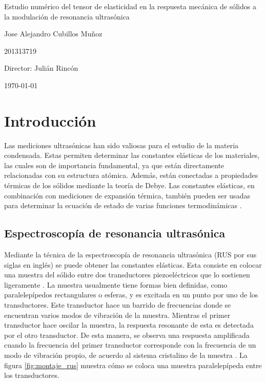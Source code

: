 \documentclass[12pt]{article}
\begin{document}
\begin{center}
\Huge
Estudio numérico del tensor de elasticidad en la respuesta mecánica de sólidos a la modulación de resonancia ultrasónica

\vspace{3mm}
\Large Jose Alejandro Cubillos Muñoz

\large
201313719


\vspace{2mm}
\Large
Director: Julián Rincón

\normalsize
\vspace{2mm}

\today
\end{center}


\normalsize
\section{Introducción}

Las mediciones ultrasónicas han sido valiosas para el estudio de la materia condensada. Estas permiten determinar las constantes elásticas de los materiales, las cuales son de importancia fundamental, ya que están directamente relacionadas con su estructura atómica. Además, están conectadas a propiedades térmicas de los sólidos mediante la teoría de Debye. Las constantes elásticas, en combinación con mediciones de expansión térmica, también pueden ser usadas para determinar la ecuación de estado de varias funciones termodinámicas \cite{Leisure_1997}.

\subsection {Espectroscopía de resonancia ultrasónica}

Mediante la técnica de la espectroscopía de resonancia ultrasónica (RUS por sus siglas en inglés) se puede obtener las constantes elásticas. Esta consiste en colocar una muestra del sólido entre dos transductores piezoeléctricos que lo sostienen ligeramente \cite{MIGLIORI19931}. La muestra usualmente tiene formas bien definidas, como paralelepípedos rectangulares o esferas, y es excitada en un punto por uno de los transductores. Este transductor hace un barrido de frecuencias donde se encuentran varios modos de vibración de la muestra. Mientras el primer transductor hace oscilar la muestra, la respuesta resonante de esta es detectada por el otro transductor. De esta manera, se observa una respuesta amplificada cuando la frecuencia del primer transductor corresponde con la frecuencia de un modo de vibración propio, de acuerdo al sistema cristalino de la muestra \cite{Leisure_1997}. La figura \ref{fig:montaje_rus} muestra cómo se coloca una muestra paralelepípeda entre los transductores.
\end{document}

